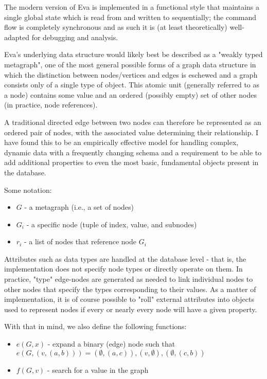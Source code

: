 \documentclass{article}
\begin{document}
      The modern version of Eva is implemented in a functional style that maintains a single global state which is read from and written to sequentially; the command flow is completely synchronous and as such it is (at least theoretically) well-adapted for debugging and analysis.

      Eva's underlying data structure would likely best be described as a "weakly typed metagraph", one of the most general possible forms of a graph data structure in which the distinction between nodes/vertices and edges is eschewed and a graph consists only of a single type of object. This atomic unit (generally referred to as a node) contains some value and an ordered (possibly empty) set of other nodes (in practice, node references).

      A traditional directed edge between two nodes can therefore be represented as an ordered pair of nodes, with the associated value determining their relationship. I have found this to be an empirically effective model for handling complex, dynamic data with a frequently changing schema and a requirement to be able to add additional properties to even the most basic, fundamental objects present in the database.

      Some notation:
      \begin{itemize}
            \item $G$ - a metagraph (i.e., a set of nodes)
            \item $G_i$ - a specific node (tuple of index, value, and subnodes)
            \item $r_i$ - a list of nodes that reference node $G_i$
      \end{itemize}

      Attributes such as data types are handled at the database level - that is, the implementation does not specify node types or directly operate on them. In practice, "type" edge-nodes are generated as needed to link individual nodes to other nodes that specify the types corresponding to their values. As a matter of implementation, it is of course possible to "roll" external attributes into objects used to represent nodes if every or nearly every node will have a given property.

      With that in mind, we also define the following functions:

      \begin{itemize}
            \item $e(G, x)$ - expand a binary (edge) node such that $e(G, (v, (a, b))) = (\emptyset, (a, c)), (v, \emptyset), (\emptyset, (c, b))$
            \item $f(G, v)$ - search for a value in the graph
      \end{itemize}
\end{document}
